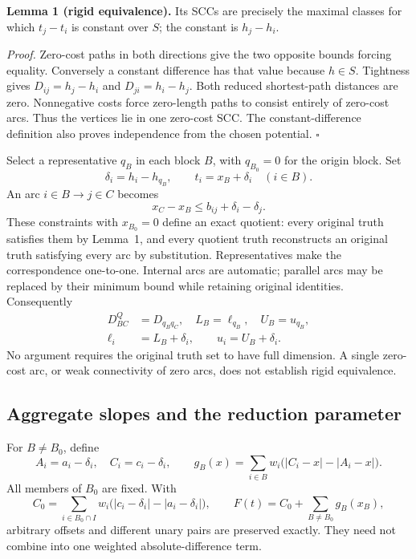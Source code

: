 \noindent\textbf{Lemma 1 (rigid equivalence).}
Its SCCs are precisely the maximal classes for which \(t_j-t_i\) is
constant over \(S\); the constant is \(h_j-h_i\).

\noindent\emph{Proof.}
Zero-cost paths in both directions give the two opposite bounds
forcing equality. Conversely a constant difference has that value
because \(h\in S\). Tightness gives
\(D_{ij}=h_j-h_i\) and \(D_{ji}=h_i-h_j\).
Both reduced shortest-path distances are zero. Nonnegative costs force
zero-length paths to consist entirely of zero-cost arcs.
Thus the vertices lie in one zero-cost SCC. The constant-difference
definition also proves independence from the chosen potential.
\(\square\)

Select a representative \(q_B\) in each block \(B\), with \(q_{B_0}=0\)
for the origin block. Set
\[
 \delta_i=h_i-h_{q_B},\qquad t_i=x_B+\delta_i
 \quad(i\in B).
\]
An arc \(i\in B\to j\in C\) becomes
\[
 x_C-x_B\le b_{ij}+\delta_i-\delta_j.                 \tag{1}
\]
These constraints with \(x_{B_0}=0\) define an exact quotient:
every original truth satisfies them by Lemma~1, and every quotient
truth reconstructs an original truth satisfying every arc by
substitution. Representatives make the correspondence one-to-one.
Internal arcs are automatic; parallel arcs may be replaced by their
minimum bound while retaining original identities.
Consequently
\[
 \begin{aligned}
 D^Q_{BC}&=D_{q_Bq_C},\quad L_B=\ell_{q_B},\quad U_B=u_{q_B},\\
 \ell_i&=L_B+\delta_i,\qquad u_i=U_B+\delta_i .
 \end{aligned}
\]
No argument requires the original truth set to have full dimension.
A single zero-cost arc, or weak connectivity of zero arcs, does not
establish rigid equivalence.

\subsection{Aggregate slopes and the reduction parameter}

For \(B\ne B_0\), define
\[
 A_i=a_i-\delta_i,\quad C_i=c_i-\delta_i,\qquad
 g_B(x)=\sum_{i\in B}w_i\bigl(|C_i-x|-|A_i-x|\bigr).
\]
All members of \(B_0\) are fixed. With
\[
 C_0=\sum_{i\in B_0\cap I}w_i
       \bigl(|c_i-\delta_i|-|a_i-\delta_i|\bigr),
 \qquad F(t)=C_0+\sum_{B\ne B_0}g_B(x_B),             \tag{2}
\]
arbitrary offsets and different unary pairs are preserved exactly.
They need not combine into one weighted absolute-difference term.


